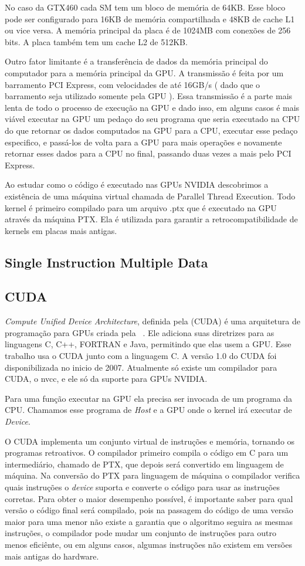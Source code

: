 No caso da GTX460 cada SM tem um bloco de memória de 64KB. Esse bloco pode ser configurado para 16KB de memória compartilhada e 48KB
de cache L1 ou vice versa. A memória principal da placa é de 1024MB com conexões de 256 bits. A placa também tem um
cache L2 de 512KB.

Outro fator limitante é a transferência de dados da memória principal do computador para a memória 
principal da GPU. A transmissão é feita por um barramento PCI Express, com velocidades de até 16GB/s ( dado que o
barramento seja utilizado somente pela GPU ). Essa transmissão é a parte mais lenta de todo o
processo de execução na GPU e dado isso, em alguns casos é mais viável executar na GPU um pedaço do seu programa que seria executado
na CPU do que retornar os dados computados na GPU para a CPU, executar esse pedaço especifico, e passá-los de volta para a GPU 
para mais operações e novamente retornar esses dados para a CPU no final, passando duas vezes a mais pelo PCI Express. 

Ao estudar como o código é executado nas GPUs NVIDIA descobrimos a existência de uma máquina virtual chamada de Parallel Thread Execution\cite{ptx}.
Todo kernel é primeiro compilado para um arquivo .ptx que é executado na GPU através da máquina PTX. Ela é utilizada para garantir 
a retrocompatibilidade de kernels em placas mais antigas.
\subsection{Single Instruction Multiple Data}

\subsection{CUDA}
\textit{Compute Unified Device Architecture}, definida pela (CUDA) é uma arquitetura de programação para GPUs criada 
pela ~\cite{nvidia2007compute}.
Ele adiciona suas diretrizes para as linguagens C, C++, FORTRAN e Java, permitindo que elas usem a GPU.
Esse trabalho usa o CUDA junto com a linguagem C.
A versão 1.0 do CUDA foi disponibilizada no inicio de 2007. Atualmente só existe um compilador para CUDA, o nvcc,
e ele só da suporte para GPUs NVIDIA.

Para uma função executar na GPU ela precisa ser invocada de um programa da CPU. Chamamos esse programa de \textit{Host}
e a GPU onde o kernel irá executar de \textit{Device}.

O CUDA implementa um conjunto virtual de instruções e memória, tornando os programas retroativos. O compilador
primeiro compila o código em C para um intermediário, chamado de PTX, que depois será convertido em linguagem
de máquina. Na conversão do PTX para linguagem de máquina o compilador verifica quais instruções o \textit{device}
suporta e converte o código para usar as instruções corretas.
Para obter o maior desempenho possível, é importante saber para qual versão o código final será compilado, 
pois na passagem do código de uma versão maior para uma menor não existe a garantia que o algoritmo seguira as mesmas instruções, 
o compilador pode mudar um conjunto de instruções para outro menos eficiênte, ou em alguns casos, algumas instruções não existem em
versões mais antigas do hardware.

